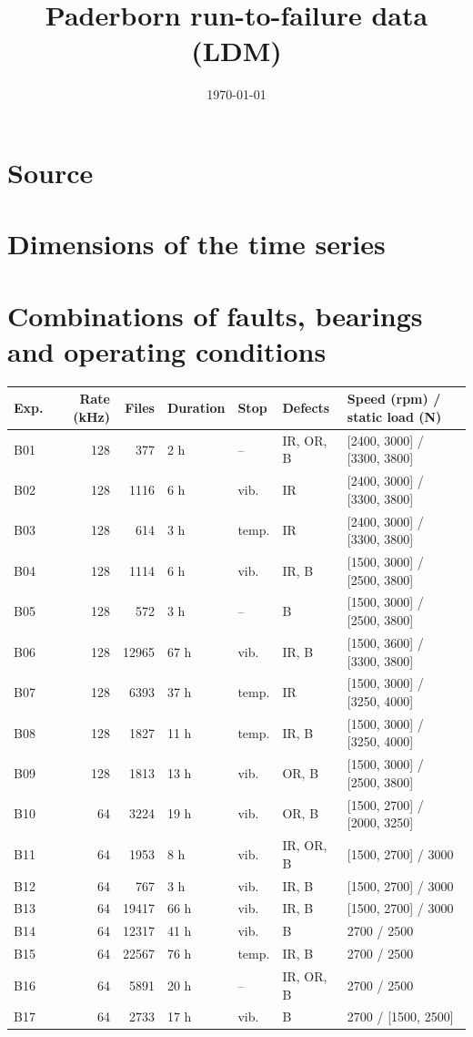 \documentclass[11pt,a4paper]{article}
\title{Paderborn run-to-failure data (LDM)}
\author{}
\date{\today}
\begin{document}
\maketitle

\section{Source}

\section{Dimensions of the time series}

\section{Combinations of faults, bearings and operating conditions}

\begin{table}[h]
\centering
\footnotesize
\begin{tabular}{l r r l l l l}
\toprule
Exp. & Rate (kHz) & Files & Duration & Stop & Defects & Speed (rpm) / static load (N) \\
\midrule
B01 & 128 & 377   & 2 h  & --    & IR, OR, B & [2400, 3000] / [3300, 3800] \\
B02 & 128 & 1116  & 6 h  & vib.  & IR        & [2400, 3000] / [3300, 3800] \\
B03 & 128 & 614   & 3 h  & temp. & IR        & [2400, 3000] / [3300, 3800] \\
B04 & 128 & 1114  & 6 h  & vib.  & IR, B     & [1500, 3000] / [2500, 3800] \\
B05 & 128 & 572   & 3 h  & --    & B         & [1500, 3000] / [2500, 3800] \\
B06 & 128 & 12965 & 67 h & vib.  & IR, B     & [1500, 3600] / [3300, 3800] \\
B07 & 128 & 6393  & 37 h & temp. & IR        & [1500, 3000] / [3250, 4000] \\
B08 & 128 & 1827  & 11 h & temp. & IR, B     & [1500, 3000] / [3250, 4000] \\
B09 & 128 & 1813  & 13 h & vib.  & OR, B     & [1500, 3000] / [2500, 3800] \\
B10 & 64  & 3224  & 19 h & vib.  & OR, B     & [1500, 2700] / [2000, 3250] \\
B11 & 64  & 1953  & 8 h  & vib.  & IR, OR, B & [1500, 2700] / 3000 \\
B12 & 64  & 767   & 3 h  & vib.  & IR, B     & [1500, 2700] / 3000 \\
B13 & 64  & 19417 & 66 h & vib.  & IR, B     & [1500, 2700] / 3000 \\
B14 & 64  & 12317 & 41 h & vib.  & B         & 2700 / 2500 \\
B15 & 64  & 22567 & 76 h & temp. & IR, B     & 2700 / 2500 \\
B16 & 64  & 5891  & 20 h & --    & IR, OR, B & 2700 / 2500 \\
B17 & 64  & 2733  & 17 h & vib.  & B         & 2700 / [1500, 2500] \\
\bottomrule
\end{tabular}
\end{table}
\end{document}
